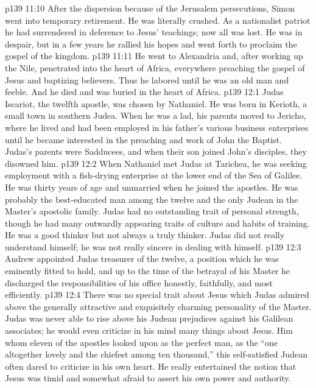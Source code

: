 \pc \vs p139 11:10 After the dispersion because of the Jerusalem persecutions, Simon went into temporary retirement. He was literally crushed. As a nationalist patriot he had surrendered in deference to Jesus’ teachings; now all was lost. He was in despair, but in a few years he rallied his hopes and went forth to proclaim the gospel of the kingdom.
\vs p139 11:11 He went to Alexandria and, after working up the Nile, penetrated into the heart of Africa, everywhere preaching the gospel of Jesus and baptizing believers. Thus he labored until he was an old man and feeble. And he died and was buried in the heart of Africa.
\vs p139 12:1 Judas Iscariot, the twelfth apostle, was chosen by Nathaniel. He was born in Kerioth, a small town in southern Judea. When he was a lad, his parents moved to Jericho, where he lived and had been employed in his father’s various business enterprises until he became interested in the preaching and work of John the Baptist. Judas’s parents were Sadducees, and when their son joined John’s disciples, they disowned him.
\pc \vs p139 12:2 When Nathaniel met Judas at Tarichea, he was seeking employment with a fish\hyp{}drying enterprise at the lower end of the Sea of Galilee. He was thirty years of age and unmarried when he joined the apostles. He was probably the best\hyp{}educated man among the twelve and the only Judean in the Master’s apostolic family. Judas had no outstanding trait of personal strength, though he had many outwardly appearing traits of culture and habits of training. He was a good thinker but not always a truly  thinker. Judas did not really understand himself; he was not really sincere in dealing with himself.
\vs p139 12:3 Andrew appointed Judas treasurer of the twelve, a position which he was eminently fitted to hold, and up to the time of the betrayal of his Master he discharged the responsibilities of his office honestly, faithfully, and most efficiently.
\pc \vs p139 12:4 There was no special trait about Jesus which Judas admired above the generally attractive and exquisitely charming personality of the Master. Judas was never able to rise above his Judean prejudices against his Galilean associates; he would even criticize in his mind many things about Jesus. Him whom eleven of the apostles looked upon as the perfect man, as the “one altogether lovely and the chiefest among ten thousand,” this self\hyp{}satisfied Judean often dared to criticize in his own heart. He really entertained the notion that Jesus was timid and somewhat afraid to assert his own power and authority.
